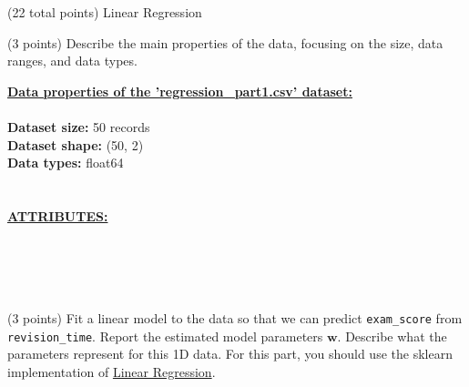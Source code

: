 \documentclass[12pt]{article}
\begin{document}
\begin{question}{(22 total points) Linear Regression}
\begin{subquestion}{(3 points) Describe the main properties of the data, focusing on the size, data ranges, and data types.   
}
\begin{answerbox}{30em}
\large{\textbf{\underline{Data properties of the 'regression\_part1.csv' dataset:}}}\\
\\
\normalsize{
\textbf{Dataset size:} 50 records\\
\textbf{Dataset shape:} (50, 2)\\
\textbf{Data types:} float64\\
\\
\\
\textbf{\underline{ATTRIBUTES:}}}\\
\\
\\
\\
\\
\end{answerbox}



\end{subquestion}




%
%
\begin{subquestion}{(3 points) Fit a linear model to the data so that we can predict \texttt{exam\_score} from \texttt{revision\_time}. 
Report the estimated model parameters $\mathbf{w}$. 
Describe what the parameters represent for this 1D data. 
For this part, you should use the sklearn implementation of \href{https://scikit-learn.org/0.19/modules/generated/sklearn.linear_model.LinearRegression.html}{Linear Regression}.\\
}



\end{subquestion}
\end{question}
\end{document}
